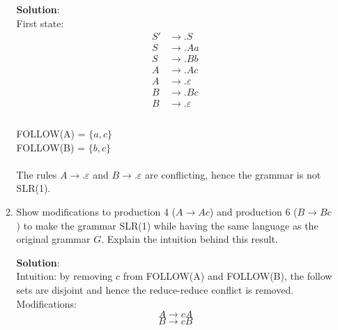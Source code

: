 \documentclass[11pt]{article}
\let\epsilon\varepsilon
\begin{document}
\begin{enumerate}
\begin{enumerate}
    \textbf{Solution}:
    \\
    First state:\\
    \begin{equation*}
    \begin{split}
      S' &\to .S \\
      S &\to .Aa \\
      S &\to .Bb \\
      A &\to .Ac \\
      A &\to .\epsilon\\
      B &\to .Bc \\
      B &\to .\epsilon \\
    \end{split}
  \end{equation*}
  \\
  FOLLOW(A) = $\{a, c\}$\\
  FOLLOW(B) = $\{b, c\}$\\
  \\
  The rules $A \to .\epsilon$ and $B \to .\epsilon$ are conflicting, hence the grammar is not SLR(1).

  \item Show modifications to production 4 ($A \to Ac$) and production 6 ($B \to Bc$) to make the grammar SLR(1) while having the same language as the original grammar $G$. Explain the intuition behind this result.

    \textbf{Solution}:\\
    Intuition: by removing $c$ from FOLLOW(A) and FOLLOW(B), the follow sets are disjoint and hence the reduce-reduce conflict is removed.
    \\
    Modifications:\\
    $$A\to cA$$
    $$B\to cB$$
  \end{enumerate} 

\end{enumerate}
\end{document}
